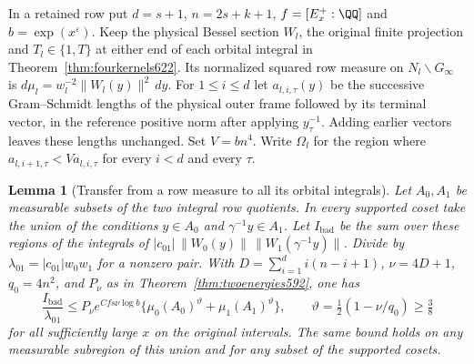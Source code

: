 \documentclass[a4paper,11pt]{article}
\newtheorem{lemma}[proposition]{Lemma}
\theoremstyle{definition}
\theoremstyle{remark}
\numberwithin{equation}{section}
\begin{document}
In a retained row put \(d=s+1\), \(n=2s+k+1\),
\(f=[E_x^+:\QQ]\) and \(b=\exp(x^\varepsilon)\).
Keep the physical Bessel section \(W_l\), the original finite
projection and \(T_l\in\{1,T\}\) at either end of each orbital
integral in Theorem~\ref{thm:fourkernels622}. Its normalized
squared row measure on \(N_l\backslash G_\infty\) is
\(d\mu_l=w_l^{-2}\|W_l(y)\|^2\,dy\).
For \(1\le i\le d\) let \(a_{l,i,\tau}(y)\) be the successive
Gram--Schmidt lengths of the physical outer frame followed by
its terminal vector, in the reference positive norm after applying
\(y_\tau^{-1}\). Adding earlier vectors leaves these lengths
unchanged. Set \(V=bn^4\). Write \(\Omega_l\) for the region
where \(a_{l,i+1,\tau}<V a_{l,i,\tau}\) for every \(i<d\)
and every \(\tau\).

\begin{lemma}[Transfer from a row measure to all its orbital integrals]
\leavevmode\label{lem:rowmeasure664}
Let \(A_0,A_1\) be measurable subsets of the two integral row
quotients. In every supported coset take the union of the
conditions \(y\in A_0\) and \(\gamma^{-1}y\in A_1\).
Let \(I_{\mathrm{bad}}\) be the sum over these regions of the
integrals of
\(|c_{01}|\,\|W_0(y)\|\,\|W_1(\gamma^{-1}y)\|\).
Divide by \(\lambda_{01}=|c_{01}|w_0w_1\) for a nonzero pair.
With \(D=\sum_{i=1}^d i(n-i+1)\), \(\nu=4D+1\),
\(q_0=4n^2\), and \(P_\nu\) as in
Theorem~\ref{thm:twoenergies592}, one has
\[
 \frac{I_{\mathrm{bad}}}{\lambda_{01}}
 \le P_\nu e^{Cfs\nu\log b}
       \big\{\mu_0(A_0)^{\vartheta}+\mu_1(A_1)^{\vartheta}\big\},
 \qquad \vartheta=\tfrac12(1-\nu/q_0)\ge\tfrac38
\]
for all sufficiently large \(x\) on the original intervals.
The same bound holds on any measurable subregion of this union
and for any subset of the supported cosets.
\end{lemma}
\end{document}
